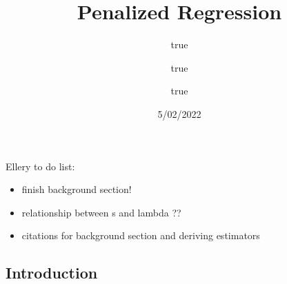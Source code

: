 \documentclass[
]{article}
\title{Penalized Regression}
\author{true \and true \and true}
\date{5/02/2022}
\providecommand{\tightlist}{%
  \setlength{\itemsep}{0pt}\setlength{\parskip}{0pt}}
\begin{document}
\maketitle

{
\setcounter{tocdepth}{2}
\tableofcontents
}
Ellery to do list:

\begin{itemize}
\tightlist
\item
  finish background section!
\item
  relationship between s and lambda ??
\item
  citations for background section and deriving estimators
\end{itemize}

\hypertarget{introduction}{%
\subsection{Introduction}\label{introduction}}
\end{document}
